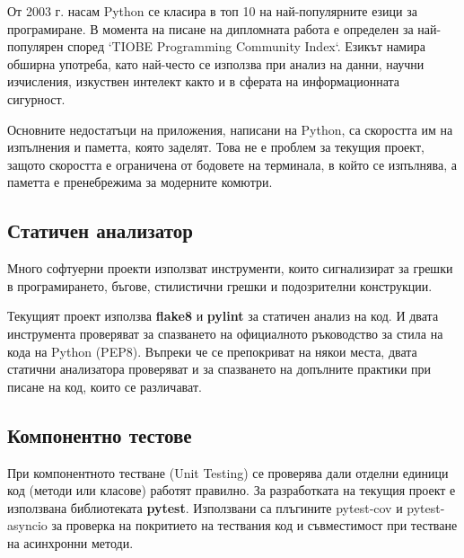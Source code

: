                 От 2003 г. насам Python се класира в топ 10 на най-популярните
                езици за програмиране. В момента на писане на дипломната работа
                е определен за най-популярен според `TIOBE Programming 
                Community Index`. Езикът намира обширна употреба, като 
                най-често се използва при анализ на данни, научни изчисления, 
                изкуствен интелект както и в сферата на информационната 
                сигурност. 

                Основните недостатъци на приложения, написани на Python, са 
                скоростта им на изпълнения и паметта, която заделят. Това не е
                проблем за текущия проект, защото скоростта е ограничена от
                бодовете на терминала, в който се изпълнява, а паметта е 
                пренебрежима за модерните комютри. 

        \subsection{Статичен анализатор}
                
                Много софтуерни проекти използват инструменти, които 
                сигнализират за грешки в програмирането, бъгове, стилистични
                грешки и подозрителни конструкции.

                Текущият проект използва \textbf{flake8} и \textbf{pylint} за
                статичен анализ на  код. И двата инструмента проверяват за
                спазването на официалното ръководство за стила на кода на
                Python (PEP8). Въпреки че се препокриват на някои места, двата
                статични анализатора проверяват и за спазването на допълните
                практики при писане на код, които се различават.
        \subsection {Компонентно тестове}
                
                При компонентното тестване (Unit Testing) се проверява дали 
                отделни единици код (методи или класове) работят правилно. За
                разработката на текущия проект е използвана библиотеката
                \textbf{pytest}. Използвани са плъгините pytest-cov и
                pytest-asyncio за проверка на покритието на тествания код и
                съвместимост при тестване на асинхронни методи.

